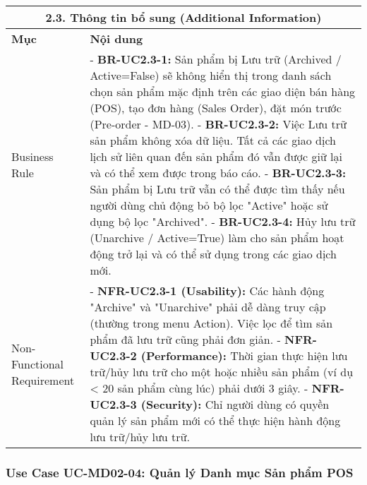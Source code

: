 \begin{longtable}{|m{4cm}|p{11cm}|}
\hline
\multicolumn{2}{|c|}{\textbf{2.3. Thông tin bổ sung (Additional Information)}} \\
\hline
\textbf{Mục} & \textbf{Nội dung} \\
\hline
Business Rule & - \textbf{BR-UC2.3-1:} Sản phẩm bị Lưu trữ (Archived / Active=False) sẽ không hiển thị trong danh sách chọn sản phẩm mặc định trên các giao diện bán hàng (POS), tạo đơn hàng (Sales Order), đặt món trước (Pre-order - MD-03). \newline - \textbf{BR-UC2.3-2:} Việc Lưu trữ sản phẩm không xóa dữ liệu. Tất cả các giao dịch lịch sử liên quan đến sản phẩm đó vẫn được giữ lại và có thể xem được trong báo cáo. \newline - \textbf{BR-UC2.3-3:} Sản phẩm bị Lưu trữ vẫn có thể được tìm thấy nếu người dùng chủ động bỏ bộ lọc "Active" hoặc sử dụng bộ lọc "Archived". \newline - \textbf{BR-UC2.3-4:} Hủy lưu trữ (Unarchive / Active=True) làm cho sản phẩm hoạt động trở lại và có thể sử dụng trong các giao dịch mới. \\
\hline
Non-Functional Requirement & - \textbf{NFR-UC2.3-1 (Usability):} Các hành động "Archive" và "Unarchive" phải dễ dàng truy cập (thường trong menu Action). Việc lọc để tìm sản phẩm đã lưu trữ cũng phải đơn giản. \newline - \textbf{NFR-UC2.3-2 (Performance):} Thời gian thực hiện lưu trữ/hủy lưu trữ cho một hoặc nhiều sản phẩm (ví dụ < 20 sản phẩm cùng lúc) phải dưới 3 giây. \newline - \textbf{NFR-UC2.3-3 (Security):} Chỉ người dùng có quyền quản lý sản phẩm mới có thể thực hiện hành động lưu trữ/hủy lưu trữ. \\
\hline

\end{longtable}

\subsubsection{Use Case UC-MD02-04: Quản lý Danh mục Sản phẩm POS}

